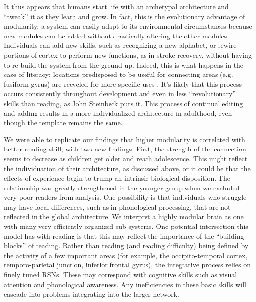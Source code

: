 It thus appears that humans start life with an archetypal architecture  and ``tweak'' it as they learn and grow. In fact, this is the evolutionary advantage of modularity: a system can easily adapt to its environmental circumstances because new modules can be added without drastically altering the other modules \citep{Kashtan2005}. Individuals can add new skills, such as recognizing a new alphabet, or rewire portions of cortex to perform new functions, as in stroke recovery, without having to re-build the system from the ground up. Indeed, this is what happens in the case of literacy: locations predisposed to be useful for connecting areas (e.g. fusiform gyrus) are recycled for more specific uses \citep{Saygin2016}. It's likely that this process occurs consistently throughout development and even in less ``revolutionary'' skills than reading, as John Steinbeck puts it. This process of continual editing and adding results in a more individualized architecture in adulthood, even though the template remains the same. 

We were able to replicate our findings that higher modularity is correlated with better reading skill, with two new findings. First, the strength of the connection seems to decrease as children get older and reach adolescence. This might reflect the individuation of their architecture, as discussed above, or it could be that the effects of experience begin to trump an intrinsic biological disposition. The relationship was greatly strengthened in the younger group when we excluded very poor readers from analysis. One possibility is that individuals who struggle may have focal differences, such as in phonological processing, that are not reflected in the global architecture. We interpret a highly modular brain as one with many very efficiently organized sub-systems. One potential intersection this model has with reading is that this may reflect the importance of the ``building blocks'' of reading. Rather than reading (and reading difficulty) being defined by the activity of a few important areas (for example, the occipito-temporal cortex, temporo-parietal junction, inferior frontal gyrus), the integrative process relies on finely tuned RSNs. These may correspond with cognitive skills such as visual attention and phonological awareness. Any inefficiencies in these basic skills will cascade into problems integrating into the larger network.